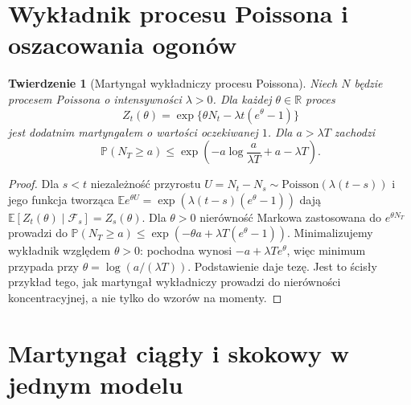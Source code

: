 \documentclass[11pt,a4paper,oneside]{report}
\numberwithin{equation}{chapter}
\theoremstyle{plain}
\newtheorem{twierdzenie}{Twierdzenie}[chapter]
\theoremstyle{definition}
\theoremstyle{remark}
\newcommand{\R}{\mathbb{R}}
\newcommand{\Prob}{\mathbb{P}}
\newcommand{\E}{\mathbb{E}}
\newcommand{\calF}{\mathcal{F}}
\begin{document}
\section{Wykładnik procesu Poissona i oszacowania ogonów}
\begin{twierdzenie}[Martyngał wykładniczy procesu Poissona]
Niech $N$ będzie procesem Poissona o intensywności
$\lambda>0$. Dla każdej $\theta\in\R$ proces
\[
Z_t(\theta)=\exp\{\theta N_t-\lambda t(e^\theta-1)\}
\]
jest dodatnim martyngałem o wartości oczekiwanej $1$.
Dla $a>\lambda T$ zachodzi
\[
\Prob(N_T\ge a)\le
\exp\left(-a\log\frac{a}{\lambda T}+a-\lambda T\right).
\]
\end{twierdzenie}
\begin{proof}
Dla $s<t$ niezależność przyrostu
$U=N_t-N_s\sim\mathrm{Poisson}(\lambda(t-s))$
i jego funkcja tworząca
$\E e^{\theta U}=\exp(\lambda(t-s)(e^\theta-1))$
dają $\E[Z_t(\theta)\mid\calF_s]=Z_s(\theta)$.
Dla $\theta>0$ nierówność Markowa zastosowana do
$e^{\theta N_T}$ prowadzi do
$\Prob(N_T\ge a)\le
\exp(-\theta a+\lambda T(e^\theta-1))$.
Minimalizujemy wykładnik względem $\theta>0$:
pochodna wynosi $-a+\lambda Te^\theta$, więc
minimum przypada przy $\theta=\log(a/(\lambda T))$.
Podstawienie daje tezę. Jest to ścisły przykład tego,
jak martyngał wykładniczy prowadzi do nierówności
koncentracyjnej, a nie tylko do wzorów na momenty.
\end{proof}

\section{Martyngał ciągły i skokowy w jednym modelu}
\end{document}
